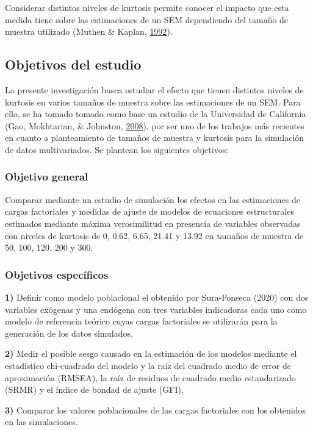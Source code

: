 \documentclass[
  english]{revcoles}
\begin{document}
Considerar distintos niveles de kurtosis permite conocer el impacto que
esta medida tiene sobre las estimaciones de un SEM dependiendo del
tamaño de muestra utilizado (Muthen \& Kaplan,
\protect\hyperlink{ref-muthen}{1992}).

\subsection{Objetivos del estudio}

La presente investigación busca estudiar el efecto que tienen distintos
niveles de kurtosis en varios tamaños de muestra sobre las estimaciones
de un SEM. Para ello, se ha tomado tomado como base un estudio de la
Universidad de California (Gao, Mokhtarian, \& Johnston,
\protect\hyperlink{ref-gao}{2008}), por ser uno de los trabajos más
recientes en cuanto a planteamiento de tamaños de muestra y kurtosis
para la simulación de datos multivariados. Se plantean los siguientes
objetivos:

\subsubsection{Objetivo general}

Comparar mediante un estudio de simulación los efectos en las
estimaciones de cargas factoriales y medidas de ajuste de modelos de
ecuaciones estructurales estimados mediante máxima verosimilitud en
presencia de variables observadas con niveles de kurtosis de 0, 0.62,
6.65, 21.41 y 13.92 en tamaños de muestra de 50, 100, 120, 200 y 300.

\subsubsection{Objetivos específicos}

\textbf{1)} Definir como modelo poblacional el obtenido por Sura-Fonseca
(2020) con dos variables exógenas y una endógena con tres variables
indicadoras cada uno como modelo de referencia teórico cuyas cargas
factoriales se utilizarán para la generación de los datos simulados.

\textbf{2)} Medir el posible sesgo causado en la estimación de los
modelos mediante el estadístico chi-cuadrado del modelo y la raíz del
cuadrado medio de error de aproximación (RMSEA), la raíz de residuos de
cuadrado medio estandarizado (SRMR) y el índice de bondad de ajuste
(GFI).

\textbf{3)} Comparar los valores poblacionales de las cargas factoriales
con los obtenidos en las simulaciones.
\end{document}
